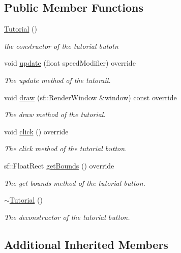 \subsection*{Public Member Functions}
\begin{DoxyCompactItemize}
\item 
\hyperlink{class_tutorial_ad7c4fc0559170fee4a60b9f67ceb3333}{Tutorial} ()
\begin{DoxyCompactList}\small\item\em the constructor of the tutorial butotn \end{DoxyCompactList}\item 
void \hyperlink{class_tutorial_aeaa7fe8ebcd65dc23ca2df5c73ba5a48}{update} (float speed\+Modifier) override
\begin{DoxyCompactList}\small\item\em The update method of the tutorail. \end{DoxyCompactList}\item 
void \hyperlink{class_tutorial_a3bb07b16d7b980d6f7027482b5d88704}{draw} (sf\+::\+Render\+Window \&window) const override
\begin{DoxyCompactList}\small\item\em The draw method of the tutorial. \end{DoxyCompactList}\item 
void \hyperlink{class_tutorial_a8d000f10154e7a04cf000bf83ad472b9}{click} () override
\begin{DoxyCompactList}\small\item\em The click method of the tutorial button. \end{DoxyCompactList}\item 
sf\+::\+Float\+Rect \hyperlink{class_tutorial_a500c307eac5babe342bc8dd105e281a6}{get\+Bounds} () override
\begin{DoxyCompactList}\small\item\em The get bounds method of the tutorial button. \end{DoxyCompactList}\item 
\hyperlink{class_tutorial_a6a7f12f75952c7d801c12aed8179f510}{$\sim$\+Tutorial} ()
\begin{DoxyCompactList}\small\item\em The deconstructor of the tutorial button. \end{DoxyCompactList}\end{DoxyCompactItemize}
\subsection*{Additional Inherited Members}


